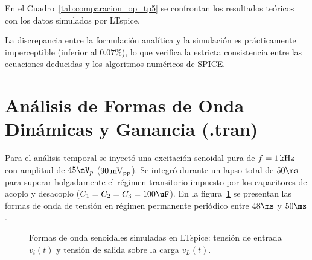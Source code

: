 En el Cuadro~\ref{tab:comparacion_op_tp5} se confrontan los resultados teóricos con los datos simulados por LTspice.

\begin{table}[!ht]
  \centering
  \caption{Confrontación entre el cálculo analítico normalizado y la simulación .op en LTspice.}
  \label{tab:comparacion_op_tp5}
\end{table}

La discrepancia entre la formulación analítica y la simulación es prácticamente imperceptible (inferior al $0.07\%$),
lo que verifica la estricta consistencia entre las ecuaciones deducidas y los algoritmos numéricos de SPICE.

\section{Análisis de Formas de Onda Dinámicas y Ganancia (.tran)}

Para el análisis temporal se inyectó una excitación senoidal pura de $f = 1\,\mathrm{kHz}$ con amplitud de $45\mV_p$ ($90\,\mathrm{mV}_{\mathrm{pp}}$).
Se integró durante un lapso total de $50\ms$ para superar holgadamente el régimen transitorio impuesto por los
capacitores de acoplo y desacoplo ($C_1 = C_2 = C_3 = 100\uF$). En la figura~\ref{fig:sim_waveforms} se presentan las
formas de onda de tensión en régimen permanente periódico entre $48\ms$ y $50\ms$.

\begin{figure}[!ht]
  \centering
  
  \caption{Formas de onda senoidales simuladas en LTspice: tensión de entrada $v_i(t)$ y tensión de salida sobre la carga $v_L(t)$.}
  \label{fig:sim_waveforms}
\end{figure}

